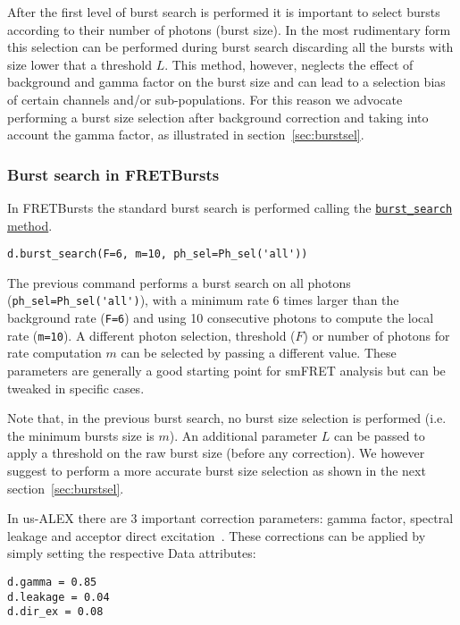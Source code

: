 After the first level of burst search is performed it is important to select
bursts according to their number of photons (burst size). In the most
rudimentary form this selection can be performed during burst search discarding
all the bursts
with size lower that a threshold $L$. This method, however, neglects the effect
of background and gamma factor on the burst size and can lead to a selection
bias of certain channels and/or sub-populations. 
For this reason we advocate performing a burst size selection after background
correction and taking into account the gamma factor, as illustrated in
section~\ref{sec:burstsel}.

\subsubsection{Burst search in FRETBursts}
\label{sec:burstsearch_code}

In FRETBursts the standard burst search is performed calling the
\href{http://fretbursts.readthedocs.org/en/latest/data\_class.html#fretbursts.burstlib.Data.burst\_search}{\texttt{burst\_search} method}.

\begin{verbatim}
d.burst_search(F=6, m=10, ph_sel=Ph_sel('all'))
\end{verbatim}

The previous command performs a burst search on all photons
(\verb|ph_sel=Ph_sel('all')|), with a minimum rate 6 times larger than the
background rate (\verb|F=6|) and using 10 consecutive photons to compute the
local rate (\verb|m=10|).
A different photon selection, threshold ($F$) or number of photons for rate
computation $m$ can be selected by passing a different value. These parameters
are generally a good starting point for smFRET analysis but can be tweaked in
specific cases.

Note that, in the previous burst search, no burst size selection is performed
(i.e. the minimum bursts size is $m$). 
An additional parameter $L$ can be passed to apply a threshold on the raw burst
size (before any correction). 
We however suggest to perform a more accurate burst size selection as shown in
the next section~\ref{sec:burstsel}.

In us-ALEX there are 3 important correction parameters: gamma factor, spectral
leakage and 
acceptor direct excitation~\cite{Lee_2005}. These corrections can be applied by
simply setting the respective
Data attributes:

\begin{verbatim}
d.gamma = 0.85
d.leakage = 0.04
d.dir_ex = 0.08
\end{verbatim}

